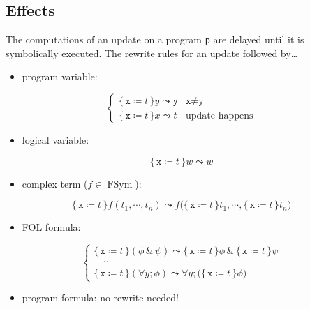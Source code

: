 \documentclass[a4paper, 11pt, accentcolor = tud3b]{tudreport}
\DeclareMathOperator{\FSym}{FSym}
\begin{document}
			\subsection{Effects}
				The computations of an update on a program \texttt{p} are delayed until it is symbolically executed. The rewrite rules for an update followed by\dots
				\begin{itemize}
					\item program variable:
				\end{itemize}
				\begin{equation*}
					\begin{cases}
						\{\, \texttt{x} \coloneqq t \,\} y \leadsto \texttt{y} & \texttt{x} \neq \texttt{y} \\
						\{\, \texttt{x} \coloneqq t \,\} x \leadsto t          & \textrm{update happens}
					\end{cases}
				\end{equation*}
				\begin{itemize}
					\item logical variable:
				\end{itemize}
				\begin{equation*}
					\{\, \texttt{x} \coloneqq t \,\} w \leadsto w
				\end{equation*}
				\begin{itemize}
					\item complex term (\( f \in \FSym \)):
				\end{itemize}
				\begin{equation*}
					\{\, \texttt{x} \coloneqq t \,\} f(t_1, \cdots, t_n) \leadsto f\big( \{\, \texttt{x} \coloneqq t \,\} t_1, \cdots, \{\, \texttt{x} \coloneqq t \,\} t_n \big)
				\end{equation*}
				\begin{itemize}
					\item FOL formula:
				\end{itemize}
				\begin{equation*}
					\begin{cases}
						\{\, \texttt{x} \coloneqq t \,\} (\phi \,\&\, \psi) \leadsto \{\, \texttt{x} \coloneqq t \,\} \phi \,\&\, \{\, \texttt{x} \coloneqq t \,\} \psi \\
						\quad\cdots \\
						\{\, \texttt{x} \coloneqq t \,\} (\forall y; \phi) \leadsto \forall y; \big( \{\, \texttt{x} \coloneqq t \,\} \phi \big)
					\end{cases}
				\end{equation*}
				\begin{itemize}
					\item program formula: no rewrite needed!
				\end{itemize}
\end{document}
